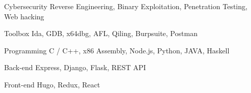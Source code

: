 

\begin{cvskills}

  \cvskill
    {Cybersecurity} %
    {Reverse Engineering, Binary Exploitation, Penetration Testing, Web hacking} %

  \cvskill
    {Toolbox}
    {Ida, GDB, x64dbg, AFL, Qiling, Burpsuite, Postman}
    
  \cvskill
    {Programming} %
    {C / C++, x86 Assembly, Node.js, Python, JAVA, Haskell} %

  \cvskill
    {Back-end} %
    {Express, Django, Flask, REST API} %

  \cvskill
    {Front-end} %
    {Hugo, Redux, React} %


\end{cvskills}
